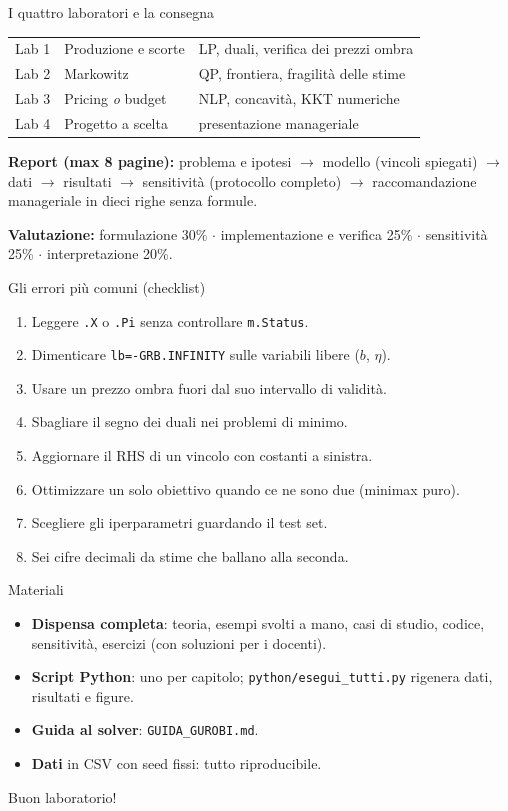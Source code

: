 \documentclass[11pt,aspectratio=169]{beamer}
\begin{document}
\begin{frame}{I quattro laboratori e la consegna}
\begin{center}\small
\begin{tabular}{lll}
\toprule
Lab 1 & Produzione e scorte & LP, duali, verifica dei prezzi ombra \\
Lab 2 & Markowitz & QP, frontiera, fragilità delle stime \\
Lab 3 & Pricing \emph{o} budget & NLP, concavità, KKT numeriche \\
Lab 4 & Progetto a scelta & presentazione manageriale \\
\bottomrule
\end{tabular}
\end{center}
\textbf{Report (max 8 pagine):} problema e ipotesi $\to$ modello (vincoli spiegati)
$\to$ dati $\to$ risultati $\to$ sensitività (protocollo completo) $\to$
\alert{raccomandazione manageriale in dieci righe senza formule}.

\vspace{1ex}
\textbf{Valutazione:} formulazione 30\% $\cdot$ implementazione e verifica 25\%
$\cdot$ sensitività 25\% $\cdot$ interpretazione 20\%.
\end{frame}

\begin{frame}{Gli errori più comuni (checklist)}
\begin{enumerate}
  \item Leggere \texttt{.X} o \texttt{.Pi} senza controllare \texttt{m.Status}.
  \item Dimenticare \texttt{lb=-GRB.INFINITY} sulle variabili libere ($b$, $\eta$).
  \item Usare un prezzo ombra fuori dal suo intervallo di validità.
  \item Sbagliare il segno dei duali nei problemi di minimo.
  \item Aggiornare il RHS di un vincolo con costanti a sinistra.
  \item Ottimizzare un solo obiettivo quando ce ne sono due (minimax puro).
  \item Scegliere gli iperparametri guardando il test set.
  \item Sei cifre decimali da stime che ballano alla seconda.
\end{enumerate}
\end{frame}

\begin{frame}{Materiali}
\begin{itemize}
  \item \textbf{Dispensa completa}: teoria, esempi svolti a mano, casi di studio,
        codice, sensitività, esercizi (con soluzioni per i docenti).
  \item \textbf{Script Python}: uno per capitolo; \texttt{python/esegui\_tutti.py}
        rigenera dati, risultati e figure.
  \item \textbf{Guida al solver}: \texttt{GUIDA\_GUROBI.md}.
  \item \textbf{Dati} in CSV con seed fissi: tutto riproducibile.
\end{itemize}
\vspace{2ex}
\centering
\Large\color{blunotte} Buon laboratorio!
\end{frame}
\end{document}
